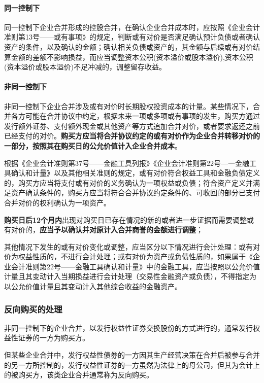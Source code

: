 \documentclass[UTF8,12pt]{ctexart}
\numberwithin{equation}{section} %
\numberwithin{figure}{section}
\numberwithin{table}{section}
\begin{document}
	\paragraph{同一控制下}
	同一控制下企业合并形成的控股合并，在确认企业合并成本时，应按照《企业会计准则第13号——或有事项》的规定，判断或有对价是否满足确认预计负债或者确认资产的条件，以及确认的金额；确认相关负债或资产的，其金额与后续或有对价结算金额的差额不影响损益，而应当调整资本公积(资本溢价或股本溢价),资本公积(资本溢价或股本溢价)不足冲减的，调整留存收益。
	
	\paragraph{非同一控制下}
	非同一控制下企业合并涉及或有对价时长期股权投资成本的计量。某些情况下，合并各方可能在合并协议中约定，根据未来一项或多项或有事项的发生，购买方通过发行额外证券、支付额外现金或其他资产等方式追加合并对价，或者要求返还之前已经支付的对价。\textbf{购买方应当将合并协议约定的或有对价作为企业合并转移对价的一部分，按照其在购买日的公允价值计入企业合并成本}。
	
	根据《企业会计准则第37号——金融工具列报》《企业会计准则第22号—一金融工具确认和计量》以及其他相关准则的规定，或有对价符合权益工具和金融负债定义的，购买方应当将支付或有对价的义务确认为一项权益或负债；符合资产定义并满足资产确认条件的，购买方应当将符合合并协议约定条件的、可收回的部分已支付合并对价的权利确认为一项资产。
	
	
	\textbf{购买日后12个月内}出现对购买日已存在情况的新的或者进一步证据而需要调整或有对价的，\textbf{应当予以确认并对原计入合并商誉的金额进行调整}；
	
	其他情况下发生的或有对价变化或调整，应当区分以下情况进行会计处理：或有对价为权益性质的，不进行会计处理；或有对价为资产或负债性质的，如果属于《企业会计准则第22号——金融工具确认和计量》中的金融工具，应当按照以公允价值计量且其变动计入当期损益进行会计处理（交易性金融资产或负债），不得指定为以公允价值计量且其变动计入其他综合收益的金融资产。
	
	\subsubsection{反向购买的处理}
	非同一控制下的企业合并，以发行权益性证券交换股份的方式进行的，通常发行权益性证券的一方为购买方。
	
	但某些企业合并中，发行权益性债券的一方因其生产经营决策在合并后被参与合并的另一方所控制的，发行权益性证券的一方虽然为法律上的母公司，但其为会计上的被购买方，该类企业合并通常称为反向购买。
	
\end{document}
